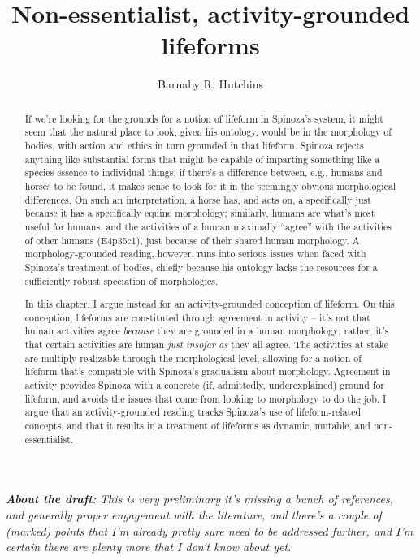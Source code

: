 \documentclass{article}
\title{Non-essentialist, activity-grounded lifeforms}
\author{Barnaby R. Hutchins}
\date{}
\newcommand{\dash}{\unskip{—}}
\begin{document}
\maketitle

\begin{center}
  \vspace{1.0cm}

  \textit{\textbf{About the draft}: This is very preliminary \dash it's missing a bunch of references, and generally proper engagement with the literature, and there's a couple of (marked) points that I'm already pretty sure need to be addressed further, and I'm certain there are plenty more that I don't know about yet.}

  \vspace{1.5cm}
\end{center}

\begin{abstract}
If we're looking for the grounds for a notion of lifeform in Spinoza's system, it might seem that the natural place to look, given his ontology, would be in the morphology of bodies, with action and ethics in turn grounded in that lifeform. Spinoza rejects anything like substantial forms that might be capable of imparting something like a species essence to individual things; if there's a difference between, e.g., humans and horses to be found, it makes sense to look for it in the seemingly obvious morphological differences. On such an interpretation, a horse has, and acts on, a specifically  just because it has a specifically equine morphology; similarly, humans are what's most useful for humans, and the activities of a human maximally \enquote{agree}  with the activities of other humans (E4p35c1), just because of their shared human morphology. A morphology-grounded reading, however, runs into serious issues when faced with Spinoza's treatment of bodies, chiefly because his ontology lacks the resources for a sufficiently robust speciation of morphologies.

In this chapter, I argue instead for an activity-grounded conception of lifeform. On this conception, lifeforms are constituted through agreement in activity – it's not that human activities agree \emph{because} they are grounded in a human morphology; rather, it's that certain activities are human \emph{just insofar as} they all agree. The activities at stake are multiply realizable through the morphological level, allowing for a notion of lifeform that's compatible with Spinoza's gradualism about morphology. Agreement in activity provides Spinoza with a concrete (if, admittedly, underexplained) ground for lifeform, and avoids the issues that come from looking to morphology to do the job. I argue that an activity-grounded reading tracks Spinoza's use of lifeform-related concepts, and that it results in a treatment of lifeforms as dynamic, mutable, and non-essentialist.
\end{abstract}
\end{document}
